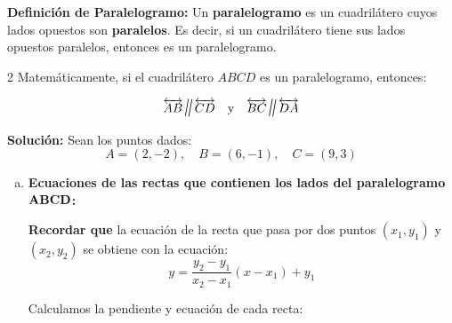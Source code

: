 \documentclass[11pt]{article}
\newcommand{\paralela}{\rotatebox[origin=c]{-10}{\Large$\parallel$}}
\begin{document}
\begin{enumerate}[\hspace{-5mm} 1) ]
{\bf Definición de Paralelogramo: } Un \textbf{paralelogramo} es un cuadrilátero cuyos lados opuestos son \textbf{paralelos}. Es decir, si un cuadrilátero tiene sus lados opuestos paralelos, entonces es un paralelogramo.

\begin{multicols}{2}
Matemáticamente, si el cuadrilátero $ABCD$ es un paralelogramo, entonces:

\[
\overleftrightarrow{AB} \paralela \overleftrightarrow{CD} \quad \text{y} \quad \overleftrightarrow{BC} \paralela \overleftrightarrow{DA}
\]


\bigskip

\begin{center}
\end{center}

\end{multicols}







{\bf Solución:} Sean los puntos dados:
\[ A = (2,-2), \quad B = (6,-1), \quad C = (9,3) \]

\begin{enumerate}[a) ]
    \item {\bf Ecuaciones de las rectas que contienen los lados del paralelogramo ${\bf ABCD}$:}










{\bf Recordar que } la ecuación de la recta que pasa por dos puntos $(x_1, y_1)$ y $(x_2, y_2)$ se obtiene con la ecuación:
\[
y =  \frac{y_2 - y_1}{x_2 - x_1} (x - x_1) + y_1 
\]

Calculamos la pendiente y ecuación de cada recta:


\end{enumerate}
\end{enumerate}
\end{document}
